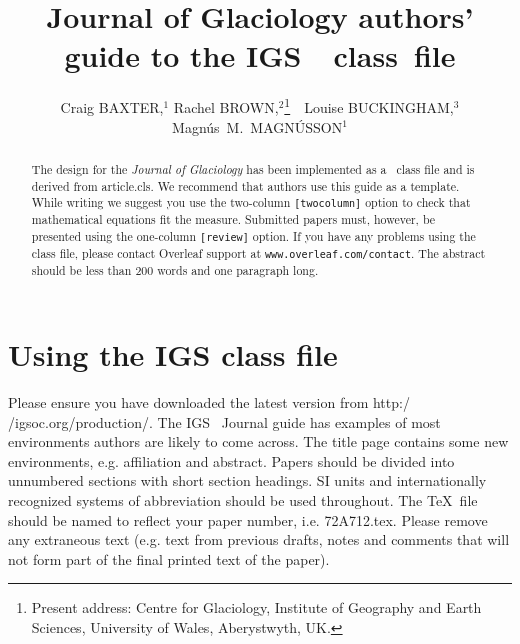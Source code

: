 \documentclass[review,jog]{igs}
\begin{document}
\title[IGS \LaTeXe\ guide]{Journal of Glaciology 
  authors' guide to the IGS~\LaTeXe~class~file}

\author[Baxter and others]{Craig BAXTER,$^1$
  Rachel BROWN,$^2$\protect\thanks{Present address:
  Centre for Glaciology, Institute of Geography and
  Earth Sciences, University of Wales, Aberystwyth,
  UK.}\ \ Louise BUCKINGHAM,$^3$ 
  Magn\'us~M.~MAGN\'USSON$^1$}


\begin{frontmatter}

\maketitle

\begin{abstract}
The design for the \emph{Journal of Glaciology} has been implemented as a \LaTeXe\ class file and is derived from article.cls. We recommend that authors use this guide as a template. While writing we suggest you use the two-column \texttt{[twocolumn]} option to check that mathematical equations fit the measure. Submitted papers must, however, be presented using the one-column \texttt{[review]} option. If you have any problems using the class file, please contact Overleaf support at \texttt{www.overleaf.com/contact}. The abstract should be less than 200 words and one paragraph long.
\end{abstract}

\end{frontmatter}


\section{Using the IGS class file}
Please ensure you have downloaded the latest version from http:/$\!$/igsoc.org/production/. The IGS \LaTeXe\ Journal guide has examples of most environments authors are likely to come across. The title page contains some new environments, e.g. affiliation and abstract. Papers should be divided into unnumbered sections with short section headings. SI units and internationally recognized systems of abbreviation should be used throughout. The \TeX\ file should be named to reflect your paper number, i.e. 72A712.tex. Please remove any extraneous text (e.g. text from previous drafts, notes and comments that will not form part of the final printed text of the paper).
\end{document}
